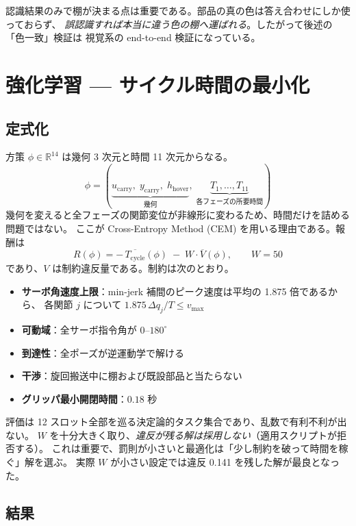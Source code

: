 \documentclass[11pt,a4paper]{article}
\begin{document}
認識結果のみで棚が決まる点は重要である。部品の真の色は答え合わせにしか使っておらず、
\emph{誤認識すれば本当に違う色の棚へ運ばれる}。したがって後述の「色一致」検証は
視覚系の end-to-end 検証になっている。

\section{強化学習 --- サイクル時間の最小化}

\subsection{定式化}
方策 $\phi \in \mathbb{R}^{14}$ は幾何 3 次元と時間 11 次元からなる。
\[
\phi = (\underbrace{u_{\text{carry}},\; y_{\text{carry}},\; h_{\text{hover}}}_{\text{幾何}},\;
\underbrace{T_1, \ldots, T_{11}}_{\text{各フェーズの所要時間}})
\]
幾何を変えると全フェーズの関節変位が非線形に変わるため、時間だけを詰める問題ではない。
ここが Cross-Entropy Method (CEM) を用いる理由である。報酬は
\[
R(\phi) = -\,\overline{T_{\text{cycle}}}(\phi) \;-\; W \cdot \overline{V}(\phi), \qquad W = 50
\]
であり、$V$ は制約違反量である。制約は次のとおり。

\begin{itemize}[leftmargin=1.4em,itemsep=1pt]
  \item \textbf{サーボ角速度上限}：min-jerk 補間のピーク速度は平均の 1.875 倍であるから、
        各関節 $j$ について $1.875\,\Delta q_j / T \le v_{\max}$
  \item \textbf{可動域}：全サーボ指令角が $0\text{--}180^\circ$
  \item \textbf{到達性}：全ポーズが逆運動学で解ける
  \item \textbf{干渉}：旋回搬送中に棚および既設部品と当たらない
  \item \textbf{グリッパ最小開閉時間}：$0.18$ 秒
\end{itemize}

\noindent
評価は 12 スロット全部を巡る決定論的タスク集合であり、乱数で有利不利が出ない。
$W$ を十分大きく取り、\emph{違反が残る解は採用しない}（適用スクリプトが拒否する）。
これは重要で、罰則が小さいと最適化は「少し制約を破って時間を稼ぐ」解を選ぶ。
実際 $W$ が小さい設定では違反 0.141 を残した解が最良となった。

\subsection{結果}
\end{document}
